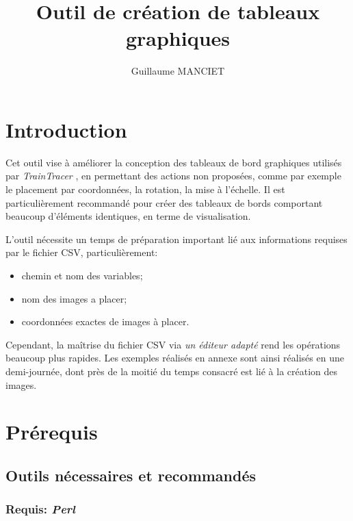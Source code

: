 \documentclass{AlstomLibrary}
\title{Outil de création de tableaux graphiques \TT}
\author{Guillaume MANCIET}
\newcommand{\progname}[1]{\textit{#1}}
\newcommand{\TT}{{\progname{TrainTracer}} }
\begin{document}
\maketitle

\tableofcontents
\setcounter{tocdepth}{2}
\listoftables
\listoffigures



\chapter{Introduction}

Cet outil vise à améliorer la conception des tableaux de bord graphiques utilisés par \TT, en permettant des actions non proposées, comme par exemple le placement par coordonnées, la rotation, la mise à l'échelle. Il est particulièrement recommandé pour créer des tableaux de bords comportant beaucoup d'éléments identiques, en terme de visualisation.

L'outil nécessite un temps de préparation important lié aux informations requises par le fichier CSV, particulièrement:
\begin{itemize}
\item chemin et nom des variables;
\item nom des images a placer;
\item coordonnées exactes de images à placer.
\end{itemize}

Cependant, la maîtrise du fichier CSV via \textsl{ un éditeur adapté} rend les opérations beaucoup plus rapides. Les exemples réalisés en annexe sont ainsi réalisés en une demi-journée, dont près de la moitié du temps consacré est lié à la création des images.

\chapter{Prérequis}

\section{Outils nécessaires et recommandés}

\subsection*{Requis: \progname{Perl}}
\end{document}
